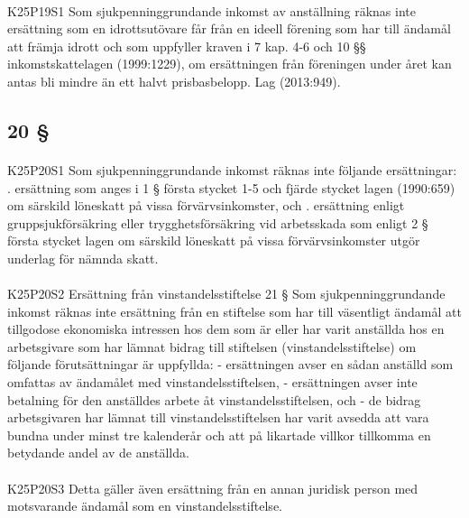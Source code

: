 \documentclass[a4paper,notitlepage,openany,10pt]{book}
\begin{document}
\paragraph*{}
{\tiny K25P19S1}
Som sjukpenninggrundande inkomst av anställning räknas inte ersättning som en idrottsutövare får från en ideell förening som har till ändamål att främja idrott och som uppfyller kraven i 7 kap. 4-6 och 10 §§ inkomstskattelagen (1999:1229), om ersättningen från föreningen under året kan antas bli mindre än ett halvt prisbasbelopp.
Lag (2013:949).
\subsection*{20 §}
\paragraph*{}
{\tiny K25P20S1}
Som sjukpenninggrundande inkomst räknas inte följande ersättningar:
. ersättning som anges i 1 § första stycket 1-5 och fjärde stycket lagen (1990:659) om särskild löneskatt på vissa förvärvsinkomster, och
. ersättning enligt gruppsjukförsäkring eller trygghetsförsäkring vid arbetsskada som enligt 2 § första stycket lagen om särskild löneskatt på vissa förvärvsinkomster utgör underlag för nämnda skatt.
\paragraph*{}
{\tiny K25P20S2}
Ersättning från vinstandelsstiftelse 21 § Som sjukpenninggrundande inkomst räknas inte ersättning från en stiftelse som har till väsentligt ändamål att tillgodose ekonomiska intressen hos dem som är eller har varit anställda hos en arbetsgivare som har lämnat bidrag till stiftelsen (vinstandelsstiftelse) om följande förutsättningar är uppfyllda: - ersättningen avser en sådan anställd som omfattas av ändamålet med vinstandelsstiftelsen,
\newline - ersättningen avser inte betalning för den anställdes arbete åt vinstandelsstiftelsen, och
\newline - de bidrag arbetsgivaren har lämnat till vinstandelsstiftelsen har varit avsedda att vara bundna under minst tre kalenderår och att på likartade villkor tillkomma en betydande andel av de anställda.
\paragraph*{}
{\tiny K25P20S3}
Detta gäller även ersättning från en annan juridisk person med motsvarande ändamål som en vinstandelsstiftelse.
\end{document}
